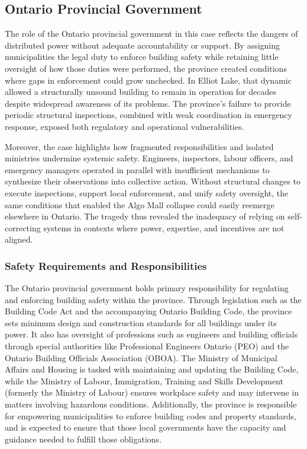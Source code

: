 \documentclass[12pt]{article}
\begin{document}
\subsection{Ontario Provincial Government}

The role of the Ontario provincial government in this case reflects the dangers of distributed power without adequate accountability or support. By assigning municipalities the legal duty to enforce building safety while retaining little oversight of how those duties were performed, the province created conditions where gaps in enforcement could grow unchecked. In Elliot Lake, that dynamic allowed a structurally unsound building to remain in operation for decades despite widespread awareness of its problems. The province's failure to provide periodic structural inspections, combined with weak coordination in emergency response, exposed both regulatory and operational vulnerabilities.

Moreover, the case highlights how fragmented responsibilities and isolated ministries undermine systemic safety. Engineers, inspectors, labour officers, and emergency managers operated in parallel with insufficient mechanisms to synthesize their observations into collective action. Without structural changes to execute inspections, support local enforcement, and unify safety oversight, the same conditions that enabled the Algo Mall collapse could easily reemerge elsewhere in Ontario. The tragedy thus revealed the inadequacy of relying on self-correcting systems in contexts where power, expertise, and incentives are not aligned.

\subsubsection*{Safety Requirements and Responsibilities}

The Ontario provincial government holds primary responsibility for regulating and enforcing building safety within the province. Through legislation such as the Building Code Act and the accompanying Ontario Building Code, the province sets minimum design and construction standards for all buildings under its power. It also has oversight of professions such as engineers and building officials through special authorities like Professional Engineers Ontario (PEO) and the Ontario Building Officials Association (OBOA). The Ministry of Municipal Affairs and Housing is tasked with maintaining and updating the Building Code, while the Ministry of Labour, Immigration, Training and Skills Development (formerly the Ministry of Labour) ensures workplace safety and may intervene in matters involving hazardous conditions. Additionally, the province is responsible for empowering municipalities to enforce building codes and property standards, and is expected to ensure that those local governments have the capacity and guidance needed to fulfill those obligations.
\end{document}
